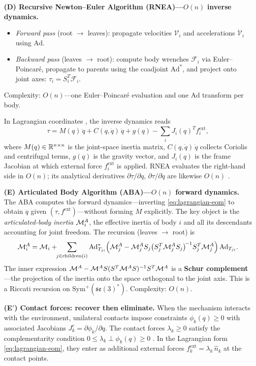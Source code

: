 \medskip\noindent\textbf{(D) Recursive Newton--Euler Algorithm
(RNEA)---$O(n)$ inverse dynamics.}
\begin{itemize}[nosep]
\item \emph{Forward pass} (root $\to$ leaves): propagate velocities
  $\mathcal{V}_i$ and accelerations $\dot{\mathcal{V}}_i$ using $\mathrm{Ad}$.
\item \emph{Backward pass} (leaves $\to$ root): compute body wrenches
  $\mathcal{F}_i$ via Euler--Poincar\'e, propagate to parents using the
  coadjoint $\mathrm{Ad}^*$, and project onto joint axes:
  $\tau_i = S_i^T \mathcal{F}_i$.
\end{itemize}
Complexity: $O(n)$---one Euler--Poincar\'e evaluation and one $\mathrm{Ad}$
transform per body.

\noindent In Lagrangian coordinates \cite{CarpentierMansard}, the inverse dynamics reads
\begin{equation}\label{eq:lagrangian-eom}
\tau = M(q)\,\ddot{q} + C(q,\dot{q})\,\dot{q} + g(q)
  - \sum_i J_i(q)^T f_i^{\mathrm{ext}},
\end{equation}
where $M(q) \in \mathbb{R}^{n \times n}$ is the joint-space inertia matrix,
$C(q,\dot{q})\,\dot{q}$ collects Coriolis and centrifugal terms,
$g(q)$ is the gravity vector, and $J_i(q)$ is the frame Jacobian at
which external force $f_i^{\mathrm{ext}}$ is applied.
RNEA evaluates the right-hand side in $O(n)$; its analytical
derivatives $\partial\tau/\partial q$, $\partial\tau/\partial\dot{q}$
are likewise $O(n)$ \cite{CarpentierMansard}.

\medskip\noindent\textbf{(E) Articulated Body Algorithm (ABA)---$O(n)$
forward dynamics.}
The ABA computes the forward dynamics---inverting \eqref{eq:lagrangian-eom}
to obtain $\ddot{q}$ given $(\tau, f^{\mathrm{ext}})$---without forming
$M$ explicitly.
The key object is the \emph{articulated-body inertia} $\mathcal{M}_i^A$, the
effective inertia of body $i$ and all its descendants accounting for joint
freedom.
The recursion (leaves $\to$ root) is
\[
\mathcal{M}_i^A = \mathcal{M}_i + \!\!\sum_{j \in \mathrm{children}(i)}
  \mathrm{Ad}_{T_{ji}}^*
  \!\left(\mathcal{M}_j^A
    - \mathcal{M}_j^A S_j \bigl(S_j^T \mathcal{M}_j^A S_j\bigr)^{\!-1} S_j^T \mathcal{M}_j^A
  \right) \mathrm{Ad}_{T_{ji}}.
\]
The inner expression
$\mathcal{M}^A - \mathcal{M}^A S(S^T\mathcal{M}^A S)^{-1} S^T \mathcal{M}^A$ is a \textbf{Schur
complement}---the projection of the inertia onto the space orthogonal to the
joint axis.
This is a Riccati recursion on $\mathrm{Sym}^+(\mathfrak{se}(3)^*)$.
Complexity: $O(n)$.

\medskip\noindent\textbf{(E$'$) Contact forces: recover then eliminate.}
When the mechanism interacts with the environment, unilateral contacts
impose constraints $\phi_k(q) \geq 0$ with associated Jacobians
$J_k^c = \partial\phi_k/\partial q$.
The contact forces $\lambda_k \geq 0$ satisfy the complementarity
condition $0 \leq \lambda_k \perp \phi_k(q) \geq 0$ \cite{MenagerCarpentier2025}.
In the Lagrangian form \eqref{eq:lagrangian-eom}, they enter as
additional external forces $f_k^{\mathrm{ext}} = \lambda_k\,\hat{n}_k$
at the contact points.


